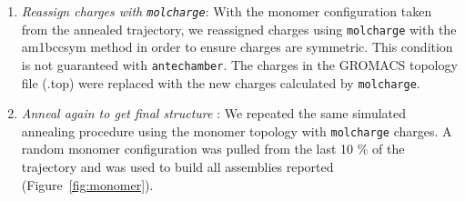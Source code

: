 \documentclass{article}
\begin{document}
\begin{enumerate}
	\item \textit{Reassign charges with \texttt{molcharge}}: With the monomer
	configuration taken from the annealed trajectory, we reassigned charges using
	\texttt{molcharge} with the am1bccsym method in order to ensure charges 
	are symmetric. This condition is not guaranteed with \texttt{antechamber}. 
	The charges in the GROMACS topology file (.top) were replaced with the 
	new charges calculated by \texttt{molcharge}. 
	\item \textit{Anneal again to get final structure} : We repeated the
	same simulated annealing procedure using the monomer topology with
	\texttt{molcharge} charges. A random monomer configuration was pulled from the
	last 10 \% of the trajectory and was used to build all assemblies reported
	(Figure~\ref{fig:monomer}).
  \end{enumerate} 
\end{document}

